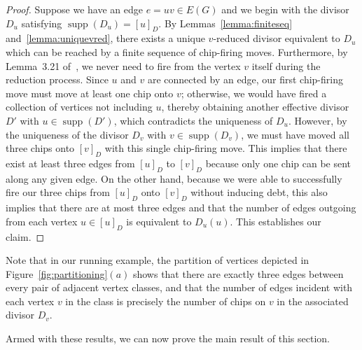 \documentclass[ALCO,ThmDefs,Unicode,epreuves]{cedram}
\DeclareMathOperator{\supp}{supp}
\begin{document}
\begin{proof}
Suppose we have an edge $e = uv \in E(G)$ and we begin with the divisor $D_u$ satisfying $\supp (D_u) = [u]_D$. By Lemmas~\ref{lemma:finiteseq} and~\ref{lemma:uniquevred}, there exists a unique $v$-reduced divisor equivalent to $D_u$ which can be reached by a finite sequence of chip-firing moves. Furthermore, by Lemma~3.21 of~\cite{db}, we never need to fire from the vertex $v$ itself during the reduction process. Since $u$ and $v$ are connected by an edge, our first chip-firing move must move at least one chip onto $v$; otherwise, we would have fired a collection of vertices not including $u$, thereby obtaining another effective divisor $D'$ with $u\in\supp (D')$, which contradicts the uniqueness of $D_u$. However, by the uniqueness of the divisor $D_v$ with $v \in \supp (D_v)$, we must have moved all three chips onto $[v]_D$ with this single chip-firing move. This implies that there exist at least three edges from $[u]_D$ to $[v]_D$ because only one chip can be sent along any given edge. On the other hand, because we were able to successfully fire our three chips from $[u]_D$ onto $[v]_D$ without inducing debt, this also implies that there are at most three edges and that the number of edges outgoing from each vertex $u \in [u]_D$ is equivalent to $D_u(u)$. This establishes our claim.
\end{proof}

Note that in our running example, the partition of vertices depicted in Figure~\ref{fig:partitioning}$(a)$ shows that there are exactly three edges between every pair of adjacent vertex classes, and that the number of edges incident with each vertex $v$ in the class is precisely the number of chips on $v$ in the associated divisor $D_v$. 

Armed with these results, we can now prove the main result of this section.
\end{document}
